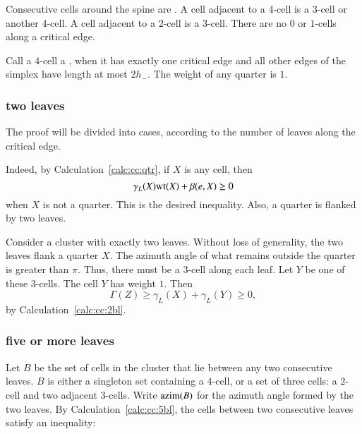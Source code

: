 Consecutive cells around the spine are .  A cell
adjacent to a $4$-cell is a $3$-cell or another $4$-cell.  A cell
adjacent to a $2$-cell is a $3$-cell.  There are no $0$ or $1$-cells
along a critical edge.  %
%

Call a $4$-cell a , when it has exactly one critical
edge and all other edges of the simplex have length at most $2 h_-$.
The weight of any quarter is $1$.


\subsubsection{two leaves}

The proof will be divided into cases, according to the number of
leaves along the critical edge.

 Indeed, by
Calculation~\ref{calc:cc:qtr}, if $X$ is any cell,
then %
\begin{displaymath}
\gamma_L(X) {\operatorname{wt}}(X) + \beta(e,X)\ge 0
\end{displaymath} 
when $X$ is not a quarter.  This is the desired inequality.  Also, a
quarter is flanked by two leaves.

Consider a cluster with exactly two leaves.
Without loss of generality, the two leaves flank a quarter
$X$. 
The azimuth angle of what remains outside the quarter
is greater than $\pi$.  Thus, there must be a $3$-cell
along each leaf.  Let $Y$ be one of these $3$-cells.
The cell $Y$ has weight $1$.
Then 
\begin{equation}\label{eqn:34}
\Gamma(Z)\ge \gamma_L(X)+\gamma_L(Y)\ge 0,
\end{equation}
by Calculation~\ref{calc:cc:2bl}.
%
%




\subsubsection{five or more leaves}

Let $B$ be the set of cells in the cluster that lie between any two
consecutive leaves.  $B$ is either a singleton set containing a
$4$-cell, or a set of three cells: a $2$-cell and two adjacent
$3$-cells.  Write ${\operatorname{azim}}(B)$ for the azimuth angle formed by the
two leaves.  By Calculation~\ref{calc:cc:5bl}, the cells between two
consecutive leaves satisfy an
inequality: %

